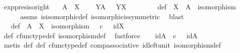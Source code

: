 \begin{isabellebody}
\isamarkupfalse%
%
\endisatagproof
{\isafoldproof}%
%
\isadelimproof
\isanewline
%
\endisadelimproof
\isanewline
{}\isamarkupfalse%
\ exp{\isacharunderscore}{\kern0pt}pres{\isacharunderscore}{\kern0pt}iso{\isacharunderscore}{\kern0pt}right{\isacharcolon}{\kern0pt}\isanewline
\ \ \ {\isachardoublequoteopen}A\ {\isasymcong}\ X{\isachardoublequoteclose}\ \isanewline
\ \ \ {\isachardoublequoteopen}Y\isactrlbsup A\isactrlesup \ {\isasymcong}\ \ Y\isactrlbsup X\isactrlesup {\isachardoublequoteclose}\isanewline
%
\isadelimproof
%
\endisadelimproof
%
\isatagproof
{}\isamarkupfalse%
\ {\isacharminus}{\kern0pt}\ \isanewline
\ \ \isamarkupfalse%
\ {\isasymphi}\ \ {\isasymphi}{\isacharunderscore}{\kern0pt}def{\isacharcolon}{\kern0pt}\ {\isachardoublequoteopen}{\isasymphi}{\isacharcolon}{\kern0pt}\ X\ {\isasymrightarrow}\ A\ {\isasymand}\ isomorphism{\isacharparenleft}{\kern0pt}{\isasymphi}{\isacharparenright}{\kern0pt}{\isachardoublequoteclose}\isanewline
\ \ \ \ \isamarkupfalse%
\ assms\ is{\isacharunderscore}{\kern0pt}isomorphic{\isacharunderscore}{\kern0pt}def\ isomorphic{\isacharunderscore}{\kern0pt}is{\isacharunderscore}{\kern0pt}symmetric\ \isamarkupfalse%
\ blast\isanewline
\ \ \isamarkupfalse%
\ {\isasympsi}\ \ {\isasympsi}{\isacharunderscore}{\kern0pt}def{\isacharcolon}{\kern0pt}\ {\isachardoublequoteopen}{\isasympsi}{\isacharcolon}{\kern0pt}\ A\ {\isasymrightarrow}\ X\ {\isasymand}\ isomorphism{\isacharparenleft}{\kern0pt}{\isasympsi}{\isacharparenright}{\kern0pt}\ {\isasymand}\ {\isacharparenleft}{\kern0pt}{\isasympsi}\ {\isasymcirc}\isactrlsub c\ {\isasymphi}\ {\isacharequal}{\kern0pt}\ id{\isacharparenleft}{\kern0pt}X{\isacharparenright}{\kern0pt}{\isacharparenright}{\kern0pt}{\isachardoublequoteclose}\isanewline
\ \ \ \ \isamarkupfalse%
\ {\isasymphi}{\isacharunderscore}{\kern0pt}def\ cfunc{\isacharunderscore}{\kern0pt}type{\isacharunderscore}{\kern0pt}def\ isomorphism{\isacharunderscore}{\kern0pt}def\ \isamarkupfalse%
\ fastforce\isanewline
\ \ \isamarkupfalse%
\ idA{\isacharcolon}{\kern0pt}\ {\isachardoublequoteopen}{\isasymphi}\ {\isasymcirc}\isactrlsub c\ {\isasympsi}\ {\isacharequal}{\kern0pt}\ id{\isacharparenleft}{\kern0pt}A{\isacharparenright}{\kern0pt}{\isachardoublequoteclose}\isanewline
\ \ \ \ \isamarkupfalse%
\ {\isacharparenleft}{\kern0pt}metis\ {\isasymphi}{\isacharunderscore}{\kern0pt}def\ {\isasympsi}{\isacharunderscore}{\kern0pt}def\ cfunc{\isacharunderscore}{\kern0pt}type{\isacharunderscore}{\kern0pt}def\ comp{\isacharunderscore}{\kern0pt}associative\ id{\isacharunderscore}{\kern0pt}left{\isacharunderscore}{\kern0pt}unit{}\ isomorphism{\isacharunderscore}{\kern0pt}def{\isacharparenright}{\kern0pt}\isanewline

\end{isabellebody}
